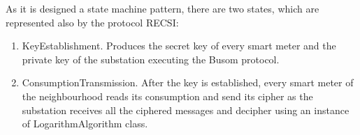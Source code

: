 
As it is designed a state machine pattern, there are two states, which are represented also by the protocol RECSI:
\begin{enumerate}
	\item KeyEstablishment. Produces the secret key of every smart meter and the private key of the substation executing the Busom protocol.
	\item ConsumptionTransmission. After the key is established, every smart meter of the neighbourhood reads its consumption and send its cipher as the substation receives all the ciphered messages and decipher using an instance of LogarithmAlgorithm class.
\end{enumerate}

